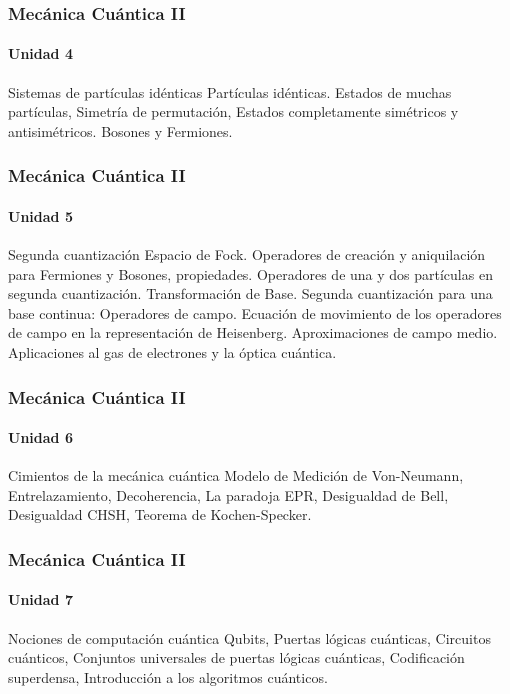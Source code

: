 \documentclass{beamer}
\begin{document}
\begin{frame}
    \frametitle{Mecánica Cuántica II}
    \framesubtitle{Unidad 4}

\begin{block}{Sistemas de partículas idénticas}
    Partículas idénticas. Estados de muchas partículas, Simetría de      
     permutación, Estados completamente simétricos y antisimétricos.      
     Bosones y Fermiones.   
\end{block}
    
\end{frame}

\begin{frame}
    \frametitle{Mecánica Cuántica II}
    \framesubtitle{Unidad 5}

\begin{block}{Segunda cuantización}
    Espacio de Fock. Operadores de creación y aniquilación para          
     Fermiones y Bosones, propiedades. Operadores de una y dos partículas 
     en segunda cuantización. Transformación de Base. Segunda             
     cuantización para una base continua: Operadores de campo. Ecuación   
     de movimiento de los operadores de campo en la representación de     
     Heisenberg. Aproximaciones de campo medio. Aplicaciones al gas de    
     electrones y la óptica cuántica. 
\end{block}
    
\end{frame}

\begin{frame}
    \frametitle{Mecánica Cuántica II}
    \framesubtitle{Unidad 6}

\begin{block}{Cimientos de la mecánica cuántica}
    Modelo de Medición de Von-Neumann, Entrelazamiento, Decoherencia, La 
    paradoja EPR, Desigualdad de Bell, Desigualdad CHSH, Teorema de    
     Kochen-Specker.  
\end{block}
    
\end{frame}

\begin{frame}
    \frametitle{Mecánica Cuántica II}
    \framesubtitle{Unidad 7}

\begin{block}{Nociones de computación cuántica}
    Qubits, Puertas lógicas cuánticas, Circuitos cuánticos, Conjuntos    
     universales de puertas lógicas cuánticas, Codificación superdensa,   
     Introducción a los algoritmos cuánticos.  
\end{block}
    
\end{frame}
\end{document}
